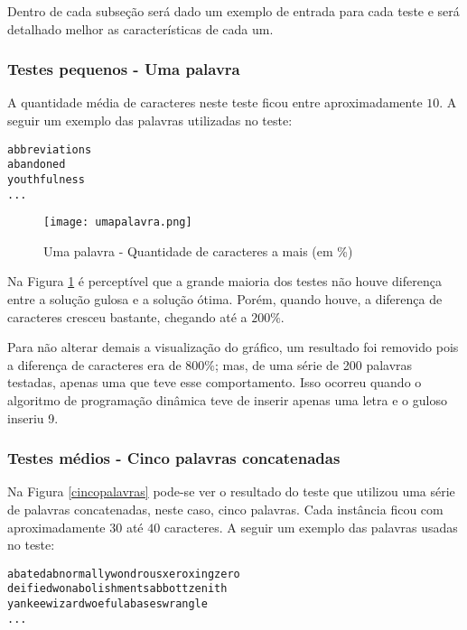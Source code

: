 \documentclass[12pt]{article}
\begin{document}
Dentro de cada subseção será dado um exemplo de entrada para cada teste e será detalhado melhor as características de cada um.

\subsubsection{Testes pequenos - Uma palavra}
\label{pequeno}

A quantidade média de caracteres neste teste ficou entre aproximadamente $10$. A seguir um exemplo das palavras utilizadas no teste:

\begin{verbatim}
abbreviations
abandoned
youthfulness
...
\end{verbatim}


    \begin{figure}[h!]
        \centering
        \texttt{[image: umapalavra.png]}
        \caption{Uma palavra - Quantidade de caracteres a mais (em \%)}
        \label{umapalavra}
    \end{figure}

    Na Figura \ref{umapalavra} é perceptível que a grande maioria dos testes não houve diferença entre a solução gulosa e a solução ótima. Porém, quando houve, a diferença de caracteres cresceu bastante, chegando até a $200\%$.

    Para não alterar demais a visualização do gráfico, um resultado foi removido pois a diferença de caracteres era de $800\%$; mas, de uma série de 200 palavras testadas, apenas uma que teve esse comportamento. Isso ocorreu quando o algoritmo de programação dinâmica teve de inserir apenas uma letra e o guloso inseriu 9.


\subsubsection{Testes médios - Cinco palavras concatenadas}
\label{medio}

Na Figura \ref{cincopalavras} pode-se ver o resultado do teste que utilizou uma série de palavras concatenadas, neste caso, cinco palavras. Cada instância ficou com aproximadamente $30$ até $40$ caracteres. A seguir um exemplo das palavras usadas no teste:

\begin{verbatim}
abatedabnormallywondrousxeroxingzero
deifiedwonabolishmentsabbottzenith
yankeewizardwoefulabaseswrangle
...
\end{verbatim}
\end{document}

